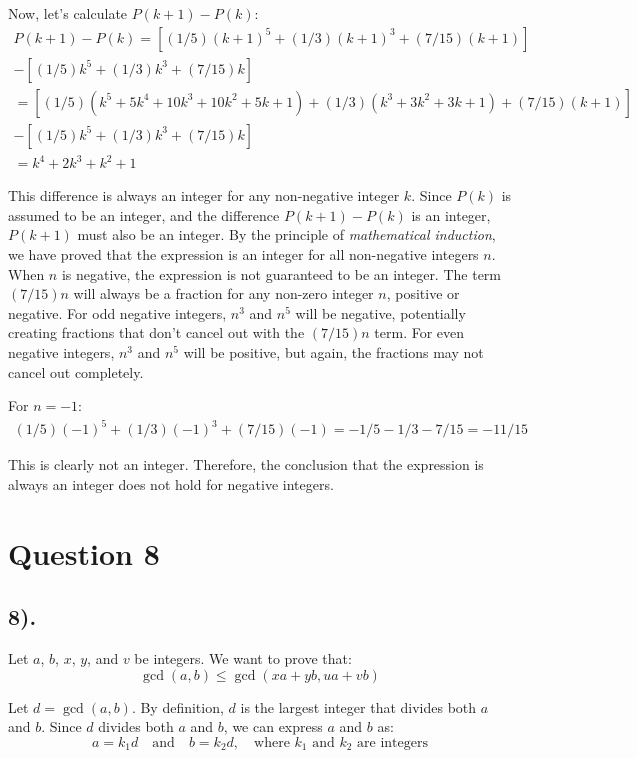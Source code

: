 \documentclass[12pt]{article}
\begin{document}
Now, let's calculate $P(k+1) - P(k)$:
\begin{gather*}
    P(k+1) - P(k) = [(1/5){(k+1)}^5 + (1/3){(k+1)}^3 + (7/15)(k+1)] \\
    - [(1/5)k^5 + (1/3)k^3 + (7/15)k] \\
    = [(1/5)(k^5 + 5k^4 + 10k^3 + 10k^2 + 5k + 1) + (1/3)(k^3 + 3k^2 + 3k + 1) + (7/15)(k+1)] \\
    - [(1/5)k^5 + (1/3)k^3 + (7/15)k] \\
    = k^4 + 2k^3 + k^2 + 1
\end{gather*}

This difference is always an integer for any non-negative integer $k$. Since $P(k)$ is assumed to be an integer, and the difference $P(k+1) - P(k)$ is an integer, $P(k+1)$ must also be an integer.
By the principle of \textit{mathematical induction}, we have proved that the expression is an integer for all non-negative integers $n$. \\

When $n$ is negative, the expression is not guaranteed to be an integer.
The term $(7/15)n$ will always be a fraction for any non-zero integer $n$, positive or negative.
For odd negative integers, $n^3$ and $n^5$ will be negative, potentially creating fractions that don't cancel out with the $(7/15)n$ term.
For even negative integers, $n^3$ and $n^5$ will be positive, but again, the fractions may not cancel out completely.

For $n = -1$:
\begin{gather*}
    (1/5){(-1)}^5 + (1/3){(-1)}^3 + (7/15)(-1) = -1/5 - 1/3 - 7/15 = -11/15
\end{gather*}

This is clearly not an integer. Therefore, the conclusion that the expression is always an integer does not hold for negative integers.

\section*{Question 8}
\subsection*{8).}
Let $a$, $b$, $x$, $y$, and $v$ be integers. We want to prove that:
\[
    \gcd(a,b) \leq \gcd(xa+yb, ua+vb)
\]

Let $d = \gcd(a,b)$. By definition, $d$ is the largest integer that divides both $a$ and $b$.
Since $d$ divides both $a$ and $b$, we can express $a$ and $b$ as:
\[
    a = k_1d \quad \text{and} \quad b = k_2d, \quad \text{where } k_1 \text{ and } k_2 \text{ are integers}
\]
\end{document}
